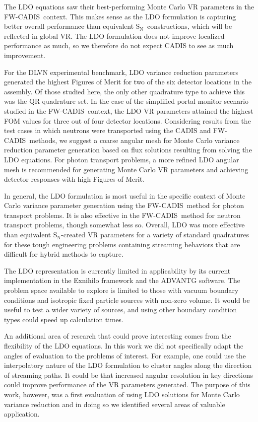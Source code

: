 \documentclass{article} %
\newcommand{\sn}{S$_\mathrm{N}$}
\newcommand{\fwc}{\mbox{FW-CADIS}}
\begin{document}
The LDO equations saw their best-performing Monte Carlo VR parameters in the
\fwc\ context. This makes sense as the LDO formulation is capturing better
overall performance than equivalent \sn\ constructions, which will be reflected
in global VR. The LDO formulation does not improve localized performance as
much, so we therefore do not expect CADIS to see as much improvement.

For the DLVN experimental benchmark, LDO variance reduction
parameters generated the highest Figures of Merit for two of the six detector
locations in the assembly. Of those studied here, the only other quadrature
type to achieve this was the QR quadrature set. In the case of the simplified
portal monitor scenario studied in the \fwc\ context, the LDO VR
parameters attained the highest FOM values for three out of four detector
locations. Considering results from the test cases in which neutrons
were transported using the CADIS and \fwc\ methods, we suggest a coarse
angular mesh for Monte Carlo variance reduction parameter generation based on
flux solutions resulting from solving the LDO equations. For photon transport
problems, a more refined LDO angular mesh is recommended for generating Monte
Carlo VR parameters and achieving detector responses with high Figures of
Merit.

In general, the LDO formulation is most useful in the specific context of Monte
Carlo variance parameter generation using the \fwc\ method for photon transport
problems. It is also effective in the \fwc\ method for neutron transport
problems, though somewhat less so. Overall, LDO was more effective than
equivalent \sn-created VR parameters for a variety of standard quadratures for
these tough engineering problems containing streaming behaviors that are
difficult for hybrid methods to capture.

The LDO representation
is currently limited in applicability by its current implementation in the
Exnihilo framework and the ADVANTG software. The problem space available to
explore is limited to those with vacuum boundary conditions and isotropic
fixed particle sources with non-zero volume. It would be useful to test a
wider variety of sources, and using other boundary condition types could speed
up calculation times.

An additional area of research that could prove interesting comes from the
flexibility of the LDO equations. In this work we did not specifically adapt
the angles of evaluation to the problems of interest. For example, one could
use the interpolatory nature of the LDO formulation to cluster angles along
the direction of streaming paths. It could be that increased angular resolution
in key directions could improve performance of the VR parameters generated.
The purpose of this work, however, was a first evaluation of using LDO
solutions for Monte Carlo variance reduction and in doing so we identified
several areas of valuable application. 
\end{document}
